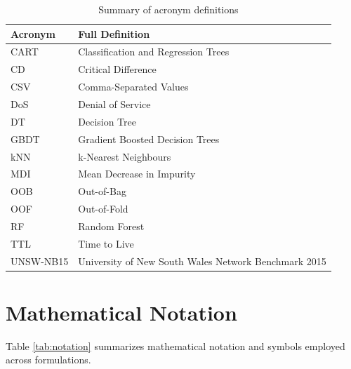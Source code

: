 \documentclass[10pt,conference,compsoc]{IEEEtran}
\begin{document}
\begin{table}[t]
\caption{Summary of acronym definitions}
\label{tab:acronyms}
\centering
\begin{tabular}{lp{5.6cm}}
\toprule
\textbf{Acronym} & \textbf{Full Definition} \\
\midrule
CART & Classification and Regression Trees \\
CD & Critical Difference \\
CSV & Comma-Separated Values \\
DoS & Denial of Service \\
DT & Decision Tree \\
GBDT & Gradient Boosted Decision Trees \\
kNN & k-Nearest Neighbours \\
MDI & Mean Decrease in Impurity \\
OOB & Out-of-Bag \\
OOF & Out-of-Fold \\
RF & Random Forest \\
TTL & Time to Live \\
UNSW-NB15 & University of New South Wales Network Benchmark 2015 \\
\bottomrule
\end{tabular}
\end{table}

\section{Mathematical Notation}
Table \ref{tab:notation} summarizes mathematical notation and symbols employed across formulations.
\end{document}

